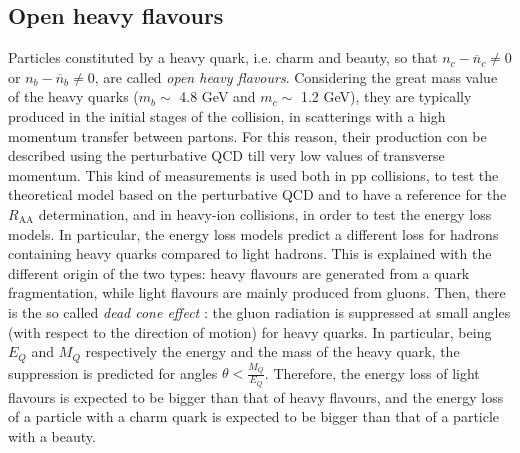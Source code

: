 \subsection{Open heavy flavours}
Particles constituted by a heavy quark, i.e. charm and beauty, so that $n_c - \overline{n}_c \neq 0$ or $n_b - \overline{n}_b \neq 0$, are called \textit{open heavy flavours}. Considering the great mass value of the heavy quarks ($m_{b}\sim$ 4.8 GeV and $m_{c}\sim$ 1.2 GeV), they are typically produced in the initial stages of the collision, in scatterings with a high momentum transfer between partons. For this reason, their production con be described using the perturbative QCD till very low values of transverse momentum. This kind of measurements is used both in pp collisions, to test the theoretical model based on the perturbative QCD and to have a reference for the $R_{\mathrm{AA}}$ determination, and in heavy-ion collisions, in order to test the energy loss models. In particular, the energy loss models predict a different loss for hadrons containing heavy quarks compared to light hadrons. This is explained with the different origin of the two types: heavy flavours are generated from a quark fragmentation, while light flavours are mainly produced from gluons. Then, there is the so called \textit{dead cone effect} \cite{deadcone}: the gluon radiation is suppressed at small angles (with respect to the direction of motion) for heavy quarks. In particular, being $E_{Q}$ and $M_{Q}$ respectively the energy and the mass of the heavy quark, the suppression is predicted for angles $\theta<\frac{M_{Q}}{E_{Q}}$. Therefore, the energy loss of light flavours is expected to be bigger than that of heavy flavours, and the energy loss of a particle with a charm quark is expected to be bigger than that of a particle with a beauty.\\
